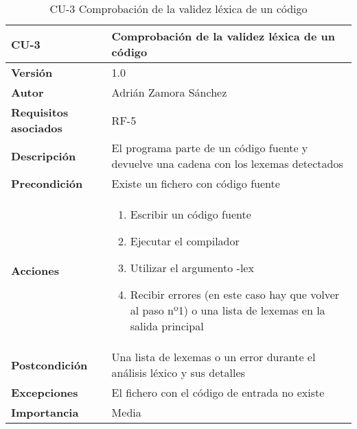 \begin{table}[p]
	\centering
	\begin{tabularx}{\linewidth}{ p{} p{} }
		\toprule
		\textbf{CU-3}    & \textbf{Comprobación de la validez léxica de un código}\\
		\toprule
		\textbf{Versión}              & 1.0    \\
		\textbf{Autor}                & Adrián Zamora Sánchez \\
		\textbf{Requisitos asociados} & RF-5\\
		\textbf{Descripción}          & El programa parte de un código fuente y devuelve una cadena con los lexemas detectados \\
		\textbf{Precondición}         & Existe un fichero con código fuente \\
		\textbf{Acciones}             &
		\begin{enumerate}
			\def\labelenumi{\arabic{enumi}.}
			\tightlist
			\item Escribir un código fuente
			\item Ejecutar el compilador
			\item Utilizar el argumento -lex
			\item Recibir errores (en este caso hay que volver al paso nº1) o una lista de lexemas en la salida principal
		\end{enumerate}\\
		\textbf{Postcondición}        & Una lista de lexemas o un error durante el análisis léxico y sus detalles \\
		\textbf{Excepciones}          & El fichero con el código de entrada no existe \\
		\textbf{Importancia}          & Media \\ 
		\bottomrule
	\end{tabularx}
	\caption{CU-3 Comprobación de la validez léxica de un código}
\end{table}

